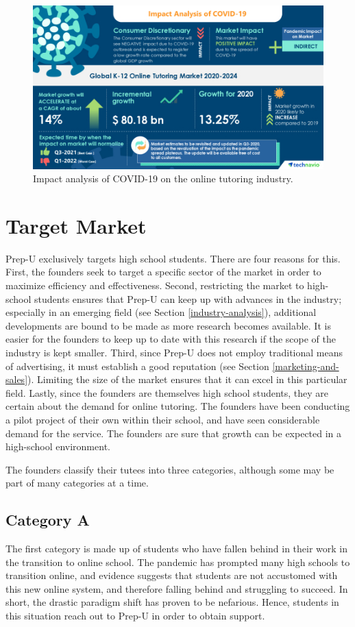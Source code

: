 \documentclass{business}
\begin{document}
    \begin{figure}[H]
        \centering
        \caption{Impact analysis of COVID-19 on the online tutoring industry. \cite{K-12-2020}}
        \includegraphics[scale=0.8]{images/infographic-2.jpg}
    \end{figure}
    \section{Target Market}\label{target-market}
    Prep-U exclusively targets high school students. There are four reasons for this. First, the founders seek to target a specific sector of the market in order to maximize efficiency and effectiveness. Second, restricting the market to high-school students ensures that Prep-U can keep up with advances in the industry; especially in an emerging field (see Section \ref{industry-analysis}), additional developments are bound to be made as more research becomes available. It is easier for the founders to keep up to date with this research if the scope of the industry is kept smaller. Third, since Prep-U does not employ traditional means of advertising, it must establish a good reputation (see Section \ref{marketing-and-sales}). Limiting the size of the market ensures that it can excel in this particular field. Lastly, since the founders are themselves high school students, they are certain about the demand for online tutoring. The founders have been conducting a pilot project of their own within their school, and have seen considerable demand for the service. The founders are sure that growth can be expected in a high-school environment.\par
    The founders classify their tutees into three categories, although some may be part of many categories at a time. 
    \subsection{Category A}
    The first category is made up of students who have fallen behind in their work in the transition to online school. The pandemic has prompted many high schools to transition online, and evidence suggests that students are not accustomed with this new online system, and therefore falling behind and struggling to succeed. In short, the drastic paradigm shift has proven to be nefarious. Hence, students in this situation reach out to Prep-U in order to obtain support. 
\end{document}
